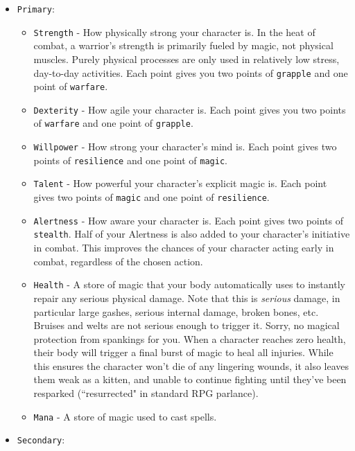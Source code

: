 \documentclass{report}
\begin{document}
\begin{itemize}
        \begin{itemize}
        \item \verb|Primary|:
            \begin{itemize}
                \item \verb|Strength| - How physically strong your character is. In the heat of combat, a warrior's strength is primarily fueled by magic, not physical muscles. Purely physical
                    processes are only used in relatively low stress, day-to-day activities. Each point gives you two points of \verb|grapple| and one point of \verb|warfare|.
                \item \verb|Dexterity| - How agile your character is. Each point gives you two points of \verb|warfare| and one point of \verb|grapple|.
                \item \verb|Willpower| - How strong your character's mind is. Each point gives two points of \verb|resilience| and one point of \verb|magic|.
                \item \verb|Talent| - How powerful your character's explicit magic is. Each point gives two points of \verb|magic| and one point of \verb|resilience|.
                \item \verb|Alertness| - How aware your character is. Each point gives two points of \verb|stealth|. Half of your Alertness is also added to your character's initiative in combat. 
                    This improves the chances of your character acting early in combat, regardless of the chosen action.
                \item \verb|Health| - A store of magic that your body automatically uses to
                instantly repair any serious physical damage. Note that this is \emph{serious}
                damage, in particular large gashes, serious internal damage, broken bones,
                etc. Bruises and welts are not serious enough to trigger it. Sorry, no 
                magical protection from spankings for you. When a character reaches zero health,
                their body will trigger a final burst of magic to heal all injuries. While this ensures
                the character won't die of any lingering wounds, it also leaves them weak as a kitten, and unable to continue fighting until they've been resparked 
                (``resurrected" in standard RPG parlance).
                \item \verb|Mana| - A store of magic used to cast spells.
            \end{itemize}
        \item \verb|Secondary|:

\end{itemize}
\end{itemize}
\end{document}
